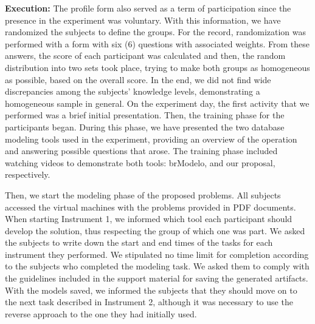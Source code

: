 \textbf{Execution:} 
The profile form also served as a term of participation since the presence in the experiment was voluntary.
With this information, we have randomized the subjects to define the groups.
For the record, randomization was performed with a form with six (6) questions with associated weights. From these answers, the score of each participant was calculated and then, the random distribution into two sets took place, trying to make both groups as homogeneous as possible, based on the overall score.
In the end, we did not find wide discrepancies among the subjects' knowledge levels, demonstrating a homogeneous sample in general.
On the experiment day, the first activity that we performed was a brief initial presentation.
Then, the training phase for the participants began.
During this phase, we have presented the two database modeling tools used in the experiment, providing an overview of the operation and answering possible questions that arose.
The training phase included watching videos to demonstrate both tools: brModelo, and our proposal, respectively.

Then, we start the modeling phase of the proposed problems.
All subjects accessed the virtual machines with the problems provided in PDF documents.
When starting Instrument 1, we informed which tool each participant should develop the solution, thus respecting the group of which one was part.
We asked the subjects to write down the start and end times of the tasks for each instrument they performed.
We stipulated no time limit for completion according to the subjects who completed the modeling task. 
We asked them to comply with the guidelines included in the support material for saving the generated artifacts.
With the models saved, we informed the subjects that they should move on to the next task described in Instrument 2, although it was necessary to use the reverse approach to the one they had initially used.

